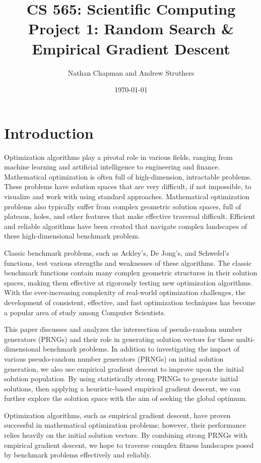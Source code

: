 \documentclass{article}
\title{\vspace*{-0.625in}CS 565: Scientific Computing \\ Project 1: Random Search \& Empirical Gradient Descent\vspace*{-0.25in}}
\author{Nathan Chapman and Andrew Struthers}
\date{\today}
\begin{document}
    \maketitle

    \section{Introduction}

        Optimization algorithms play a pivotal role in various fields, ranging from machine learning and artificial intelligence to engineering and finance. Mathematical optimization is often full of high-dimension, intractable problems. These problems have solution spaces that are very difficult, if not impossible, to visualize and work with using standard approaches.  Mathematical optimization problems also typically suffer from complex geometric solution spaces, full of plateaus, holes, and other features that make effective traversal difficult. Efficient and reliable algorithms have been created that navigate complex landscapes of these high-dimensional benchmark problem. 

        Classic benchmark problems, such as Ackley's, De Jong's, and Schwefel's functions, test various strengths and weaknesses of these algorithms. The classic benchmark functions contain many complex geometric structures in their solution spaces, making them effective at rigorously testing new optimization algorithms. With the ever-increasing complexity of real-world optimization challenges, the development of consistent, effective, and fast optimization techniques has become a popular area of study among Computer Scientists. 

        This paper discusses and analyzes the intersection of pseudo-random number generators (PRNGs) and their role in generating solution vectors for these multi-dimensional benchmark problems. In addition to investigating the impact of various pseudo-random number generators (PRNGs) on initial solution generation, we also use empirical gradient descent to improve upon the initial solution population. By using statistically strong PRNGs to generate initial solutions, then applying a heuristic-based empirical gradient descent, we can further explore the solution space with the aim of seeking the global optimum.

        Optimization algorithms, such as empirical gradient descent, have proven successful in mathematical optimization problems; however, their performance relies heavily on the initial solution vectors. By combining strong PRNGs with empirical gradient descent, we hope to traverse complex fitness landscapes posed by benchmark problems effectively and reliably.
\end{document}
